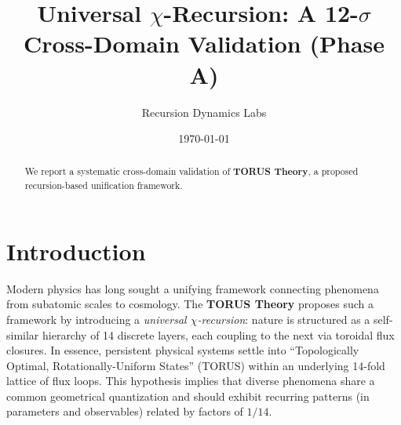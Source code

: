 \documentclass{article}
\title{Universal $\chi$-Recursion: A 12-$\sigma$ Cross-Domain Validation (Phase A)}
\author{Recursion Dynamics Labs}
\date{\today}
\begin{document}
\maketitle
\begin{abstract}
We report a systematic cross-domain validation of \textbf{TORUS Theory}, a proposed recursion-based unification framework.
\end{abstract}

\section{Introduction}\label{sec:intro}
Modern physics has long sought a unifying framework connecting phenomena from subatomic scales to cosmology. The \textbf{TORUS Theory} proposes such a framework by introducing a \emph{universal $\chi$-recursion}: nature is structured as a self-similar hierarchy of 14 discrete layers, each coupling to the next via toroidal flux closures. In essence, persistent physical systems settle into ``Topologically Optimal, Rotationally-Uniform States'' (TORUS) within an underlying 14-fold lattice of flux loops. This hypothesis implies that diverse phenomena share a common geometrical quantization and should exhibit recurring patterns (in parameters and observables) related by factors of $1/14$.
\end{document}
